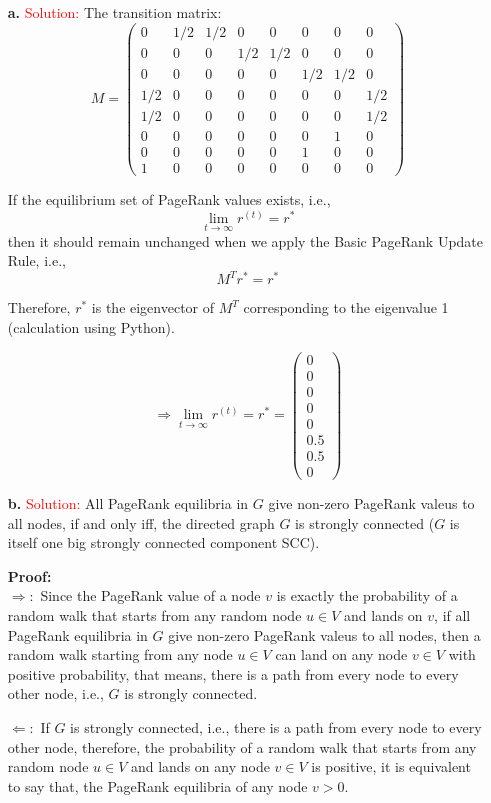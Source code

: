 \documentclass[11pt]{article} %
\begin{document}
\begin{itemize}
\item[\textbf{a. }] \textcolor{red}{Solution:}
The transition matrix:
$$ M=\left( \begin{array}{cccccccc}
0 & 1/2 & 1/2 & 0 & 0 & 0 & 0 & 0\\
0 & 0 & 0 &1/2 & 1/2 & 0 & 0 & 0\\
0 & 0 &0 & 0 & 0 &1/2 & 1/2 & 0\\
1/2 & 0 & 0 & 0 & 0 & 0 & 0 &1/2\\
1/2 & 0 & 0 & 0 & 0 & 0 & 0 &1/2\\
0 & 0 & 0 & 0 & 0 & 0 & 1 & 0\\
0 & 0 & 0 & 0 & 0 & 1 & 0 & 0\\
1 & 0 & 0 & 0 & 0 & 0 & 0 & 0
\end{array}\right) $$

If the equilibrium set of PageRank values exists, i.e., $$ \lim_{t \to \infty} r^{(t)}=  r^{*}$$ 
then it should remain unchanged when we apply the Basic PageRank Update Rule, i.e., $$M^T r^{*}=r^{*}$$

Therefore, $r^{*}$ is the eigenvector of $M^T$ corresponding to the eigenvalue 1 (calculation using Python). 

$$ \Rightarrow  \lim_{t \to \infty} r^{(t)}=  r^{*}= \left( \begin{array}{c}
0\\
0\\
0\\
0\\
0\\
0.5\\
0.5\\
0
\end{array}\right) $$

\item[\textbf{b. }] \textcolor{red}{Solution:}
All PageRank equilibria in $G$ give non-zero PageRank valeus to all nodes, if and only iff, the directed graph $G$ is strongly connected ($G$ is itself one big strongly connected component SCC).

\textbf{Proof:} \\
$\Rightarrow :$ Since the PageRank value of a node $v$ is exactly the probability of a random walk that starts from any random node $u \in V$ and lands on $v$, if all PageRank equilibria in $G$ give non-zero PageRank valeus to all nodes, then a random walk starting from any node $u \in V$ can land on any node $ v \in V$ with positive probability, that means, there is a path from every node to every other node, i.e., $G$ is strongly connected.

$\Leftarrow :$ If $G$ is strongly connected, i.e., there is a path from every node to every other node, therefore, the probability of a random walk that starts from any random node $u \in V$ and lands on any node $ v \in V$ is positive, it is equivalent to say that, the PageRank equilibria of any node $ v >0$.

\end{itemize}
\end{document}
